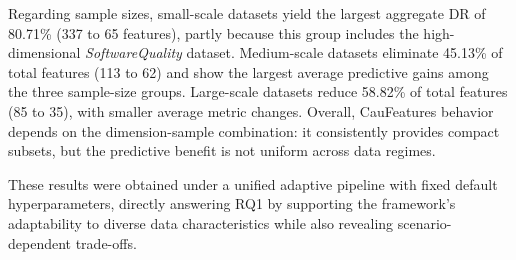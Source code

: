\documentclass[journal]{IEEEtran}
\begin{document}
Regarding sample sizes, small-scale datasets yield the largest aggregate DR of 80.71\% (337 to 65 features), partly because this group includes the high-dimensional \textit{SoftwareQuality} dataset. Medium-scale datasets eliminate 45.13\% of total features (113 to 62) and show the largest average predictive gains among the three sample-size groups. Large-scale datasets reduce 58.82\% of total features (85 to 35), with smaller average metric changes. Overall, CauFeature\textquotesingle s behavior depends on the dimension-sample combination: it consistently provides compact subsets, but the predictive benefit is not uniform across data regimes.

These results were obtained under a unified adaptive pipeline with fixed default hyperparameters, directly answering RQ1 by supporting the framework's adaptability to diverse data characteristics while also revealing scenario-dependent trade-offs.
\end{document}
